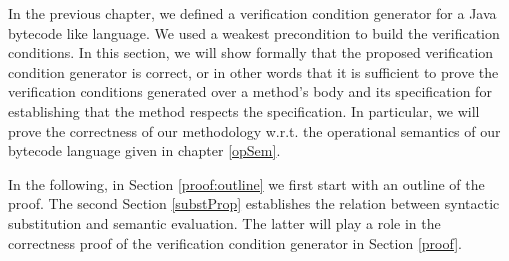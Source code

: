  In the previous chapter, we defined a verification
 condition generator for a Java bytecode like language. We used a weakest precondition
 to build the verification conditions. In this section, we will show formally that the
 proposed verification condition generator is correct, or in other words that it is sufficient
 to prove the verification conditions generated over a method's body and its specification 
 for establishing that the method respects the specification. 
 In particular, we will prove the correctness of our methodology w.r.t. the operational semantics of our bytecode language
 given in chapter \ref{opSem}. 


 

 In the following, in Section \ref{proof:outline} we first start with an outline of the proof.   
 The second Section \ref{substProp} establishes the relation between syntactic substitution  and semantic evaluation.
 The latter will play a role in the correctness proof  of the verification condition generator
 in Section  \ref{proof}.
  



